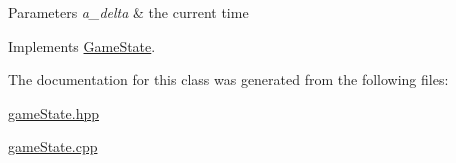 \begin{DoxyParams}{Parameters}
{\em a\+\_\+delta} & the current time \\
\hline
\end{DoxyParams}


Implements \hyperlink{class_game_state_ab1fe4312f7ce88e7dc11f9935dee67d1}{Game\+State}.



The documentation for this class was generated from the following files\+:\begin{DoxyCompactItemize}
\item 
\hyperlink{game_state_8hpp}{game\+State.\+hpp}\item 
\hyperlink{game_state_8cpp}{game\+State.\+cpp}\end{DoxyCompactItemize}
